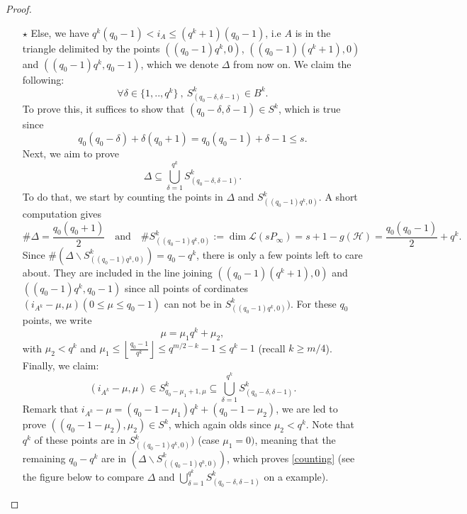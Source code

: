 \documentclass[a4paper]{article}
\newcommand{\calH}{\mathcal{H}}
\newcommand{\calL}{\mathcal{L}}
\begin{document}
\begin{proof}
\begin{itemize}
 \item[$\star$] Else, we have $q^k(q_0-1) < i_A \leq (q^k+1)(q_0-1)$, i.e $A$ is in the triangle delimited by the points $((q_0-1)q^k,0)$, $((q_0-1)(q^k+1),0)$ and $((q_0-1)q^k,q_0-1)$, which we denote $\Delta$ from now on. We claim the following:
 \[ \forall \delta \in \{1,..,q^k\} \ , \ S^k_{(q_0-\delta,\delta-1)} \in B^k.\]
 To prove this, it suffices to show that $(q_0-\delta,\delta-1) \in S^k$, which is true since
 \[q_0(q_0-\delta) + \delta(q_0+1) = q_0(q_0-1)+\delta-1 \leq s.\]
 Next, we aim to prove
 \begin{equation} \label{counting}
 \Delta \subseteq \bigcup_{\delta=1}^{q^k} S^k_{(q_0-\delta,\delta-1)}.
 \end{equation}
 To do that, we start by counting the points in $\Delta$ and $S^k_{((q_0-1)q^k,0)}$. A short computation gives
 \[ \# \Delta = \dfrac{q_0(q_0+1)}{2} \quad \mathrm{and} \quad \# S^k_{((q_0-1)q^k,0)} := \dim \calL(sP_{\infty}) = s+1-g(\calH) = \dfrac{q_0(q_0-1)}{2} + q^k.\]
 Since $\# (\Delta \backslash  S^k_{((q_0-1)q^k,0)}) = q_0-q^k$, there is only a few points left to care about.
 They are included in the line joining $((q_0-1)(q^k+1),0)$ and $((q_0-1)q^k,q_0-1)$ since all points of cordinates $(i_{A^k}-\mu,\mu) (0 \leq \mu \leq q_0-1)$ can not be in $S^k_{((q_0-1)q^k,0)})$. For these $q_0$ points, we write 
 \[ \mu = \mu_1q^k + \mu_2,\]
 with $\mu_2 < q^k$ and $\mu_1 \leq \left\lfloor\frac{q_0-1}{q^k}\right\rfloor \leq q^{m/2-k}-1 \leq q^k-1$ (recall $k \geq m/4$). Finally, we claim:
 \[(i_{A^k}-\mu,\mu) \in S^k_{q_0-\mu_1+1,\mu} \subseteq \bigcup_{\delta=1}^{q^k} S^k_{(q_0-\delta,\delta-1)}.\]
 Remark that $i_{A^k}-\mu = (q_0-1-\mu_1)q^k+(q_0-1-\mu_2)$, we are led to prove $((q_0-1-\mu_2),\mu_2) \in S^k$, which again olds since $\mu_2 < q^k$. Note that $q^k$ of these points are in $S^k_{((q_0-1)q^k,0)})$ (case $\mu_1=0)$, meaning that the remaining $q_0-q^k$ are in $(\Delta \backslash  S^k_{((q_0-1)q^k,0)})$, which proves \eqref{counting} (see the figure below to compare $\Delta$ and $\bigcup_{\delta=1}^{q^k} S^k_{(q_0-\delta,\delta-1)}$ on a example).
 
 \begin{figure}[h]
\begin{center}
\end{center}
\end{figure}
\end{itemize}
\end{proof}
\end{document}
